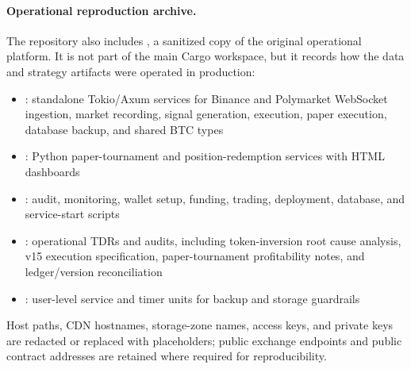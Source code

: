 \paragraph{Operational reproduction archive.}
The repository also includes , a sanitized copy of
the original operational platform. It is not part of the main Cargo workspace,
but it records how the data and strategy artifacts were operated in production:
\begin{itemize}
  \item {}: standalone Tokio/Axum services for Binance and
        Polymarket WebSocket ingestion, market recording, signal generation,
        execution, paper execution, database backup, and shared BTC types
  \item {}: Python paper-tournament and position-redemption
        services with HTML dashboards
  \item {}: audit, monitoring, wallet setup, funding, trading,
        deployment, database, and service-start scripts
  \item {}: operational TDRs and audits, including token-inversion
        root cause analysis, v15 execution specification, paper-tournament
        profitability notes, and ledger/version reconciliation
  \item {}: user-level service and timer units for backup and
        storage guardrails
\end{itemize}
Host paths, CDN hostnames, storage-zone names, access keys, and private keys are
redacted or replaced with placeholders; public exchange endpoints and public
contract addresses are retained where required for reproducibility.
